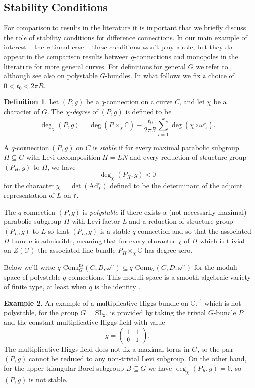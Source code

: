 \documentclass[11pt, oneside, reqno]{amsart}
\theoremstyle{definition} \newtheorem{definition}{Definition}[section]
\theoremstyle{definition} \newtheorem{remark}[definition]{Remark}
\theoremstyle{definition} \newtheorem{remarks}[definition]{Remarks}
\theoremstyle{definition} \newtheorem{question}[definition]{Question}
\theoremstyle{definition} \newtheorem*{note}{Note}
\theoremstyle{definition} \newtheorem{example}[definition]{Example}
\theoremstyle{definition} \newtheorem{examples}[definition]{Examples}
\newcommand{\bb}[1]{\mathbb{#1}}
\newcommand{\mr}[1]{\mathrm{#1}}
\newcommand{\mf}[1]{\mathfrak{#1}}
\newcommand{\CC}{\mathbb{C}}
\newcommand{\SL}{\mathrm{SL}}
\newcommand{\sub}{\subseteq}
\newcommand{\qconn}{q\text{-Conn}}
\begin{document}
\subsection{Stability Conditions} \label{stability_section}
For comparison to results in the literature it is important that we briefly discuss the role of stability conditions for difference connections.  In our main example of interest -- the rational case -- these conditions won't play a role, but they do appear in the comparison results between $q$-connections and monopoles in the literature for more general curves.  For definitions for general $G$ we refer to \cite{Smith}, although see also \cite{AnchoucheBiswas} on polystable $G$-bundles.  In what follows we fix a choice of $0 < t_0 < 2\pi R$.

\begin{definition}
Let $(P,g)$ be a $q$-connection on a curve $C$, and let $\chi$ be a character of $G$.  The \emph{$\chi$-degree} of $(P,g)$ is defined to be 
\[\deg_\chi(P,g) = \deg(P \times_\chi \CC) - \frac {t_0}{2\pi R} \sum_{i=1}^k \deg(\chi \circ \omega^\vee_{z_i}).\]

A $q$-connection $(P,g)$ on $C$ is \emph{stable} if for every maximal parabolic subgroup $H \sub G$ with Levi decomposition $H = LN$ and every reduction of structure group $(P_H, g)$ to $H$, we have
\[\deg_\chi(P_H, g) < 0\]
for the character $\chi = \det(\mr{Ad}_L^{\mf n})$ defined to be the determinant of the adjoint representation of $L$ on $\mf n$.

The $q$-connection $(P,g)$ is \emph{polystable} if there exists a (not necessarily maximal) parabolic subgroup $H$ with Levi factor $L$ and a reduction of structure group $(P_L, g)$ to $L$ so that $(P_L,g)$ is a stable $q$-connection and so that the associated $H$-bundle is admissible, meaning that for every character $\chi$ of $H$ which is trivial on $Z(G)$ the associated line bundle $P_H \times_\chi \CC$ has degree zero. 
\end{definition}

Below we'll write $\qconn_G^{\text{ps}}(C, D, \omega^\vee) \sub \qconn_G(C,D,\omega^\vee)$ for the moduli space of polystable $q$-connections.  This moduli space is a smooth algebraic variety of finite type, at least when $q$ is the identity \cite{CharbonneauHurtubise,Smith}.  

\begin{example}
An example of a multiplicative Higgs bundle on $\bb{CP}^1$ which is not polystable, for the group $G = \SL_2$, is provided by taking the trivial $G$-bundle $P$ and the constant multiplicative Higgs field with value \[g = \begin{pmatrix}1&1\\0&1\end{pmatrix}.\]  The multiplicative Higgs field does not fix a maximal torus in $G$, so the pair $(P,g)$ cannot be reduced to any non-trivial Levi subgroup.  On the other hand, for the upper triangular Borel subgroup $B \sub G$ we have $\deg_\chi(P_B, g) = 0$, so $(P,g)$ is not stable.
\end{example}
\end{document}
